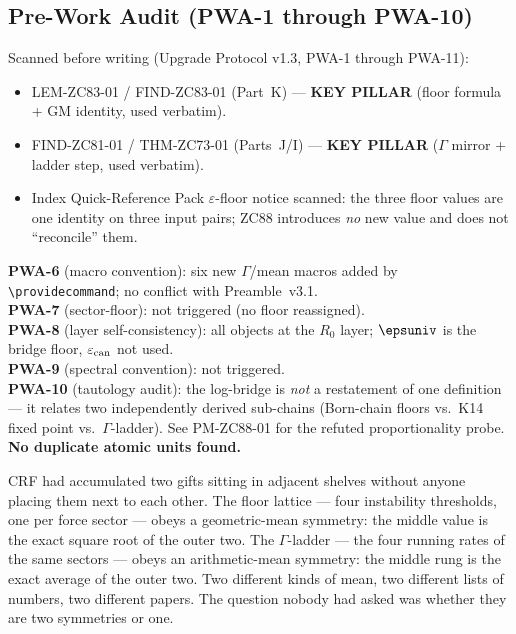 \documentclass[12pt, a4paper]{article}
\renewcommand{\epscan}{\varepsilon_{\rm can}}   %
\begin{document}
\subsection{Pre-Work Audit (PWA-1 through PWA-10)}

\begin{formalbox}[title={Pre-Work Audit Record --- ZC88}]
Scanned before writing (Upgrade Protocol v1.3, PWA-1 through PWA-11):
\begin{itemize}[leftmargin=2em, noitemsep]
  \item LEM-ZC83-01 / FIND-ZC83-01 (Part~K) --- \textbf{KEY PILLAR}
    (floor formula + GM identity, used verbatim).
  \item FIND-ZC81-01 / THM-ZC73-01 (Parts~J/I) --- \textbf{KEY PILLAR}
    ($\Gamma$ mirror + ladder step, used verbatim).
  \item Index Quick-Reference Pack $\varepsilon$-floor notice scanned:
    the three floor values are one identity on three input pairs; ZC88
    introduces \emph{no} new value and does not ``reconcile'' them.
\end{itemize}

\textbf{PWA-6} (macro convention): six new $\Gamma$/mean macros added by
\texttt{\textbackslash providecommand}; no conflict with Preamble~v3.1.\\
\textbf{PWA-7} (sector-floor): not triggered (no floor reassigned).\\
\textbf{PWA-8} (layer self-consistency): all objects at the $R_0$ layer;
$\epsuniv$ is the bridge floor, $\epscan$ not used.\\
\textbf{PWA-9} (spectral convention): not triggered.\\
\textbf{PWA-10} (tautology audit): the log-bridge is \emph{not} a
restatement of one definition --- it relates two independently derived
sub-chains (Born-chain floors vs.\ K14 fixed point vs.\ $\Gamma$-ladder).
See PM-ZC88-01 for the refuted proportionality probe.\\
\textbf{No duplicate atomic units found.}
\end{formalbox}


CRF had accumulated two gifts sitting in adjacent shelves without anyone
placing them next to each other. The floor lattice --- four instability
thresholds, one per force sector --- obeys a geometric-mean symmetry: the
middle value is the exact square root of the outer two. The $\Gamma$-ladder
--- the four running rates of the same sectors --- obeys an arithmetic-mean
symmetry: the middle rung is the exact average of the outer two. Two
different kinds of mean, two different lists of numbers, two different papers.
The question nobody had asked was whether they are two symmetries or one.
\end{document}
